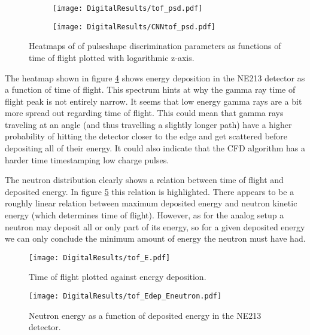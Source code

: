 \documentclass[main.tex]{subfiles}
\begin{document}
\begin{figure}
    \centering
    \begin{subfigure}[ht]{\textwidth}
        \texttt{[image: DigitalResults/tof\_psd.pdf]}
        \caption{}
        \label{fig:tof_digi_cc}
    \end{subfigure}
	\begin{subfigure}[ht]{\textwidth}
        \texttt{[image: DigitalResults/CNNtof\_psd.pdf]}
        \caption{}
        \label{fig:tof_digi_cnn}
    \end{subfigure}
    \caption{Heatmaps of of pulseshape discrimination parameters as functions of time of flight plotted with logarithmic z-axis.}
    \label{fig:tof_cc_tof_cnn}
\end{figure}

The heatmap shown in figure \ref{fig:tof_E_d} shows energy deposition in the NE213 detector as a function of time of flight. This spectrum hints at why the gamma ray time of flight peak is not entirely narrow. It seems that low energy gamma rays are a bit more spread out regarding time of flight. This could mean that gamma rays traveling at an angle (and thus travelling a slightly longer path) have a higher probability of hitting the detector closer to the edge and get scattered before depositing all of their energy. It could also indicate that the CFD algorithm has a harder time timestamping low charge pulses.

The neutron distribution clearly shows a relation between time of flight and deposited energy. In figure \ref{fig:tof_Edep_Eneutron_d} this relation is highlighted. There appears to be a roughly linear relation between maximum deposited energy and neutron kinetic energy (which determines time of flight). However, as for the analog setup a neutron may deposit all or only part of its energy, so for a given deposited energy we can only conclude the minimum amount of energy the neutron must have had.


\begin{figure}[ht]
    \centering
        \texttt{[image: DigitalResults/tof\_E.pdf]}
        \caption{Time of flight plotted against energy deposition.}
    \label{fig:tof_E_d} 
\end{figure}

\begin{figure}[ht]
    \centering
        \texttt{[image: DigitalResults/tof\_Edep\_Eneutron.pdf]}
        \caption{Neutron energy as a function of deposited energy in the NE213 detector.}
    \label{fig:tof_Edep_Eneutron_d} 
\end{figure}
\end{document}
